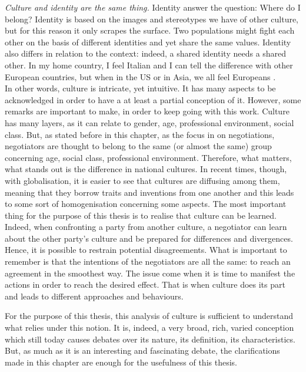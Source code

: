 \documentclass[../main.tex]{subfiles}
\begin{document}
\textit{Culture and identity are the same thing.} Identity answer the question: Where do I belong? Identity is based on the images and stereotypes we have of other culture, but for this reason it only scrapes the surface. Two populations might fight each other on the basis of different identities and yet share the same values. Identity also differs in relation to the context: indeed, a shared identity needs a shared other. In my home country, I feel Italian and I can tell the difference with other European countries, but when in the US or in Asia, we all feel Europeans \autocite[10]{hofstede2001}.\\

In other words, culture is intricate, yet intuitive. It has many aspects to be acknowledged in order to have a at least a partial conception of it. However, some remarks are important to make, in order to keep going with this work. Culture has many layers, as it can relate to gender, age, professional environment, social class. But, as stated before in this chapter, as the focus in on negotiations, negotiators are thought to belong to the same (or almost the same) group concerning age, social class, professional environment. Therefore, what matters, what stands out is the difference in national cultures. In recent times, though, with globalisation, it is easier to see that cultures are diffusing among them, meaning that they borrow traits and inventions from one another and this leads to some sort of homogenisation concerning some aspects.
The most important thing for the purpose of this thesis is to realise that culture can be learned. Indeed, when confronting a party from another culture, a negotiator can learn about the other party's culture and be prepared for differences and divergences. Hence, it is possible to restrain potential disagreements. What is important to remember is that the intentions of the negotiators are all the same: to reach an agreement in the smoothest way. The issue come when it is time to manifest the actions in order to reach the desired effect. That is when culture does its part and leads to different approaches and behaviours.

For the purpose of this thesis, this analysis of culture is sufficient to understand what relies under this notion. It is, indeed, a very broad, rich, varied conception which still today causes debates over its nature, its definition, its characteristics. But, as much as it is an interesting and fascinating debate, the clarifications made in this chapter are enough for the usefulness of this thesis.
\end{document}
